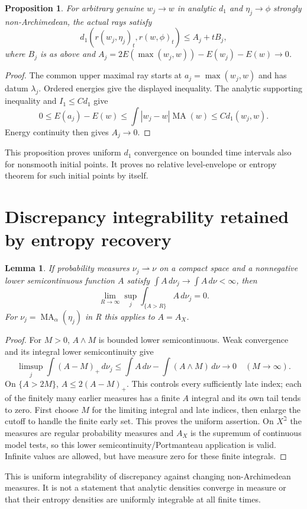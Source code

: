 \documentclass[11pt]{article}
\newcommand{\MA}{\operatorname{MA}}
\newtheorem{lemma}[theorem]{Lemma}
\newtheorem{proposition}[theorem]{Proposition}
\theoremstyle{remark}\newtheorem{remark}[theorem]{Remark}
\begin{document}
\begin{proposition}\label{prop:initial}
For arbitrary genuine $w_j\to w$ in analytic $d_1$ and
$\eta_j\to\phi$ strongly non-Archimedean, the actual rays satisfy
\[
 d_1(r(w_j,\eta_j)_t,r(w,\phi)_t)\leq A_j+tB_j,
\]
where $B_j$ is as above and
$A_j=2E(\max(w_j,w))-E(w_j)-E(w)\to0$.
\end{proposition}
\begin{proof}
The common upper maximal ray starts at $a_j=\max(w_j,w)$ and has
datum $\lambda_j$. Ordered energies give the displayed inequality.
The analytic supporting inequality and $I_1\leq Cd_1$ give
\[
 0\leq E(a_j)-E(w)\leq\int|w_j-w|\MA(w)\leq Cd_1(w_j,w).
\]
Energy continuity then gives $A_j\to0$.
\end{proof}
This proposition proves uniform $d_1$ convergence on bounded time
intervals also for nonsmooth initial points. It proves no relative
level-envelope or entropy theorem for such initial points by itself.

\section{Discrepancy integrability retained by entropy recovery}
\begin{lemma}\label{lem:UI}
If probability measures $\nu_j\rightharpoonup\nu$ on a compact
space and a nonnegative lower semicontinuous function $A$ satisfy
$\int A\,d\nu_j\to\int A\,d\nu<\infty$, then
\[
 \lim_{R\to\infty}\sup_j\int_{\{A>R\}}A\,d\nu_j=0.
\]
For $\nu_j=\MA_\alpha(\eta_j)$ in R this applies to $A=A_X$.
\end{lemma}
\begin{proof}
For $M>0$, $A\wedge M$ is bounded lower semicontinuous. Weak
convergence and its integral lower semicontinuity give
\[
 \limsup_j\int(A-M)_+\,d\nu_j
 \leq\int A\,d\nu-\int(A\wedge M)\,d\nu\to0
 \quad(M\to\infty).
\]
On $\{A>2M\}$, $A\leq2(A-M)_+$. This controls every sufficiently
late index; each of the finitely many earlier measures has a finite
$A$ integral and its own tail tends to zero. First choose $M$ for
the limiting integral and late indices, then enlarge the cutoff to
handle the finite early set. This proves the uniform assertion.
On $X^\beth$ the measures are regular probability measures and
$A_X$ is the supremum of continuous model tests, so this lower
semicontinuity/Portmanteau application is valid. Infinite values are
allowed, but have measure zero for these finite integrals.
\end{proof}
This is uniform integrability of discrepancy against changing
non-Archimedean measures. It is not a statement that analytic
densities converge in measure or that their entropy densities are
uniformly integrable at all finite times.
\end{document}
